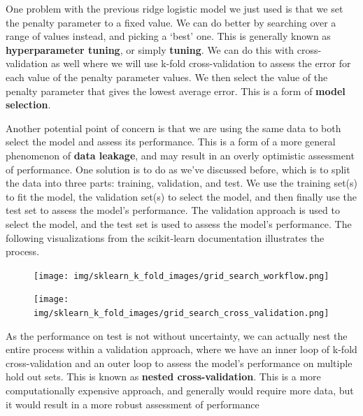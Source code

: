 \documentclass[
  letterpaper,
]{krantz}
\begin{document}
One problem with the previous ridge logistic model we just used is that
we set the penalty parameter to a fixed value. We can do better by
searching over a range of values instead, and picking a `best' one. This
is generally known as \textbf{hyperparameter tuning}, or simply
\textbf{tuning}. We can do this with cross-validation as well where we
will use k-fold cross-validation to assess the error for each value of
the penalty parameter values. We then select the value of the penalty
parameter that gives the lowest average error. This is a form of
\textbf{model selection}.

Another potential point of concern is that we are using the same data to
both select the model and assess its performance. This is a form of a
more general phenomenon of \textbf{data leakage}, and may result in an
overly optimistic assessment of performance. One solution is to do as
we've discussed before, which is to split the data into three parts:
training, validation, and test. We use the training set(s) to fit the
model, the validation set(s) to select the model, and then finally use
the test set to assess the model's performance. The validation approach
is used to select the model, and the test set is used to assess the
model's performance. The following visualizations from the scikit-learn
documentation illustrates the process.

\begin{figure}

\begin{minipage}{0.50\linewidth}

\texttt{[image: img/sklearn\_k\_fold\_images/grid\_search\_workflow.png]}

\end{minipage}%
%
\begin{minipage}{0.50\linewidth}
\texttt{[image: img/sklearn\_k\_fold\_images/grid\_search\_cross\_validation.png]}\end{minipage}%

\end{figure}%

\begin{tcolorbox}[enhanced jigsaw, colframe=quarto-callout-note-color-frame, opacityback=0, breakable, left=2mm, rightrule=.15mm, toprule=.15mm, arc=.35mm, leftrule=.75mm, colback=white, bottomrule=.15mm]

As the performance on test is not without uncertainty, we can actually
nest the entire process within a validation approach, where we have an
inner loop of k-fold cross-validation and an outer loop to assess the
model's performance on multiple hold out sets. This is known as
\textbf{nested cross-validation}. This is a more computationally
expensive approach, and generally would require more data, but it would
result in a more robust assessment of performance

\end{tcolorbox}
\end{document}
